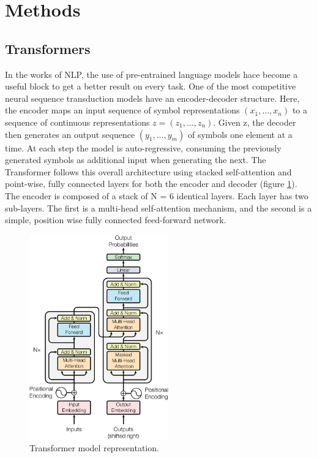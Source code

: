 \section{Methods}

\subsection{Transformers}

In the works of NLP, the use of pre-entrained language models hace become a useful block to get a better result on every task. One of the most competitive neural sequence transduction models have an encoder-decoder structure\cite{Bahdanau_2014,Cho_2014}. Here, the encoder maps an input sequence of symbol representations $(x_1 , \dots, x_n)$ to a sequence of continuous representations $z = (z_1 , \dots, z_n )$. Given z, the decoder then generates an output sequence $(y_1 , \dots, y_m )$ of symbols one element at a time. At each step the model is auto-regressive\cite{Graves_2013}, consuming the previously generated symbols as additional input when generating the next. The Transformer follows this overall architecture using stacked self-attention and point-wise, fully connected layers for both the encoder and decoder (figure \ref{fig:transformer}). The encoder is composed of a stack of N = 6 identical layers. Each layer has two sub-layers. The first is a multi-head self-attention mechanism, and the second is a simple, position wise fully connected feed-forward network.

\begin{figure}[H]
    \centering
    \includegraphics[width=6cm]{Graphics/transformer.png}
    \caption{Transformer model representation\cite{Vaswani_2017}.}
    \label{fig:transformer}
\end{figure}

